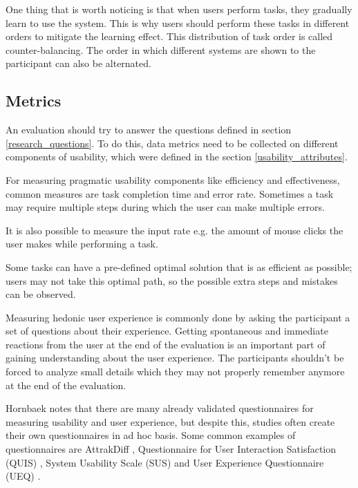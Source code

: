 One thing that is worth noticing is that when users perform tasks, they gradually learn to use the system. This is why users should perform these tasks in different orders to mitigate the learning effect. This distribution of task order is called counter-balancing. The order in which different systems are shown to the participant can also be alternated.
\cite{rubin2008handbook}

\subsection{Metrics}
An evaluation should try to answer the questions defined in section \ref{research_questions}. To do this, data metrics need to be collected on different components of usability, which were defined in the section \ref{usability_attributes}.

For measuring pragmatic usability components like efficiency and effectiveness, common measures are task completion time and error rate. Sometimes a task may require multiple steps during which the user can make multiple errors. 

It is also possible to measure the input rate e.g. the amount of mouse clicks the user makes while performing a task.

Some tasks can have a pre-defined optimal solution that is as efficient as possible; users may not take this optimal path, so the possible extra steps and mistakes can be observed. \cite{hornbaek2006current}

Measuring hedonic user experience is commonly done by asking the participant a set of questions about their experience. Getting spontaneous and immediate reactions from the user at the end of the evaluation is an important part of gaining understanding about the user experience. The participants shouldn't be forced to analyze small details which they may not properly remember anymore at the end of the evaluation. \cite{laugwitz2008construction}

Hornbaek notes that there are many already validated questionnaires for measuring usability and user experience, but despite this, studies often create their own questionnaires in ad hoc basis. \cite{hornbaek2006current} Some common examples of questionnaires are AttrakDiff \cite{hassenzahl2003attrakdiff}, Questionnaire for User Interaction Satisfaction (QUIS) \cite{chin1988questionnaire}, System Usability Scale (SUS) \cite{brooke1996sus} and User Experience Questionnaire (UEQ) \cite{laugwitz2008construction}.

